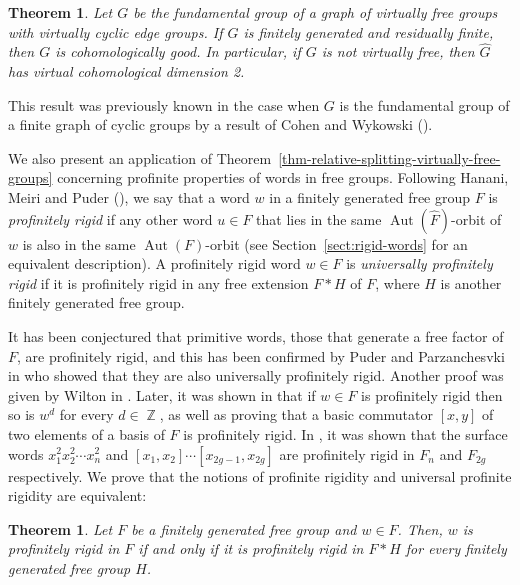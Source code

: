 \documentclass[a4paper]{amsart}
\newtheorem{teo}[lem]{Theorem}
\theoremstyle{definition}
\theoremstyle{remark}
\DeclareMathOperator{\bbz}{\mathbb{Z}}
\DeclareMathOperator{\Aut}{\mathrm{Aut}}
\begin{document}
\begin{teo}\label{goodness} Let \(G\) be the fundamental group of a graph of virtually free groups with virtually cyclic edge groups. If \(G\) is finitely generated and residually finite, then \(G\) is cohomologically good. In particular, if \(G\) is not virtually free, then \(\widehat{G}\) has virtual cohomological dimension 2.
\end{teo}

This result was previously known in the case when \(G\) is the fundamental group of a finite graph of cyclic groups by a result of Cohen and Wykowski (\cite{CW24}).

We also present an application of Theorem~\ref{thm-relative-splitting-virtually-free-groups} concerning profinite properties of words in free groups. Following Hanani, Meiri and Puder (\cite[Def. 1.3]{hanany_orbits_2020}), we say that a word \(w\) in a finitely generated free group \(F\) is \emph{profinitely rigid} if any other word \(u \in F\) that lies in the same \(\Aut(\widehat{F})\)-orbit of \(w\) is also in the same \(\Aut(F)\)-orbit (see Section~\ref{sect:rigid-words} for an equivalent description). A profinitely rigid word \(w \in F\) is \emph{universally profinitely rigid} if it is profinitely rigid in any free extension \(F * H\) of \(F\), where \(H\) is another finitely generated free group.

It has been conjectured that primitive words, those that generate a free factor of \(F\), are profinitely rigid, and this has been confirmed by Puder and Parzanchesvki in \cite{Puder2014} who showed that they are also universally profinitely rigid. Another proof was given by Wilton in \cite{Wi18}. Later, it was shown in \cite{hanany_orbits_2020} that if \(w \in F\) is profinitely rigid then so is \(w^d\) for every \(d \in \bbz\), as well as proving that a basic commutator \([x,y]\) of two elements of a basis of \(F\) is profinitely rigid. In \cite{wilton_profinite_2021}, it was shown that the surface words \(x_1^2x_2^2\cdots x_n^2\) and \([x_1,x_2]\cdots[x_{2g-1},x_{2g}]\) are profinitely rigid in \(F_n\) and \(F_{2g}\) respectively. We prove that the notions of profinite rigidity and universal profinite rigidity are equivalent:

\begin{teo}\label{theorem-profinitely-rigid-words} Let \(F\) be a finitely generated free group and \(w \in F\). Then, \(w\) is profinitely rigid in \(F\) if and only if it is profinitely rigid in \(F * H\) for every finitely generated free group \(H\).
\end{teo}
\end{document}
